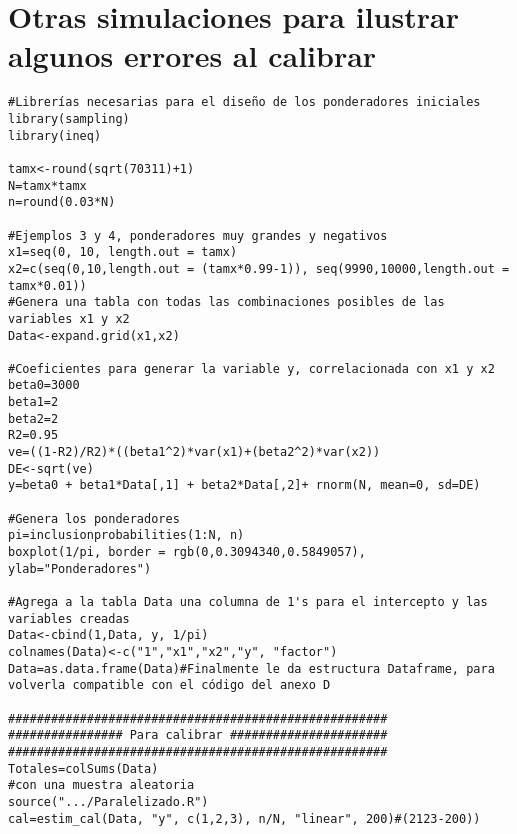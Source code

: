 \documentclass[a4paper,twoside,openright,12pt]{book}
\theoremstyle{definition}
\numberwithin{equation}{chapter}
\numberwithin{figure}{chapter}
\numberwithin{table}{chapter}
\numberwithin{theorem}{chapter}
\numberwithin{lemma}{chapter}
\begin{document}
\chapter{Otras simulaciones para ilustrar algunos errores al calibrar}\label{anx:A1}
\begin{lstlisting}
#Librerías necesarias para el diseño de los ponderadores iniciales
library(sampling)
library(ineq)

tamx<-round(sqrt(70311)+1)
N=tamx*tamx
n=round(0.03*N)

#Ejemplos 3 y 4, ponderadores muy grandes y negativos
x1=seq(0, 10, length.out = tamx)
x2=c(seq(0,10,length.out = (tamx*0.99-1)), seq(9990,10000,length.out = tamx*0.01))
#Genera una tabla con todas las combinaciones posibles de las variables x1 y x2
Data<-expand.grid(x1,x2)

#Coeficientes para generar la variable y, correlacionada con x1 y x2
beta0=3000
beta1=2
beta2=2
R2=0.95	
ve=((1-R2)/R2)*((beta1^2)*var(x1)+(beta2^2)*var(x2))
DE<-sqrt(ve)
y=beta0 + beta1*Data[,1] + beta2*Data[,2]+ rnorm(N, mean=0, sd=DE)

#Genera los ponderadores
pi=inclusionprobabilities(1:N, n)
boxplot(1/pi, border = rgb(0,0.3094340,0.5849057), ylab="Ponderadores")

#Agrega a la tabla Data una columna de 1's para el intercepto y las variables creadas
Data<-cbind(1,Data, y, 1/pi)
colnames(Data)<-c("1","x1","x2","y", "factor")
Data=as.data.frame(Data)#Finalmente le da estructura Dataframe, para volverla compatible con el código del anexo D

#####################################################
################ Para calibrar ######################
#####################################################
Totales=colSums(Data)
#con una muestra aleatoria
source(".../Paralelizado.R")
cal=estim_cal(Data, "y", c(1,2,3), n/N, "linear", 200)#(2123-200))
\end{lstlisting}
\end{document}
